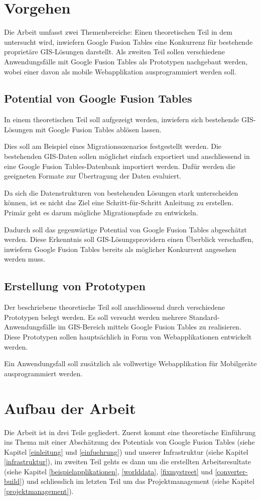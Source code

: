 \section{Vorgehen}
Die Arbeit umfasst zwei Themenbereiche: Einen theoretischen Teil in dem untersucht wird, inwiefern Google Fusion Tables eine Konkurrenz für bestehende proprietäre \gls{GIS}-Lösungen darstellt. Als zweiten Teil sollen verschiedene Anwendungsfälle mit Google Fusion Tables als Prototypen nachgebaut werden, wobei einer davon als mobile Webapplikation ausprogrammiert werden soll.

\subsection{Potential von Google Fusion Tables}
In einem theoretischen Teil soll aufgezeigt werden, inwiefern sich bestehende \gls{GIS}-Lösungen mit Google Fusion Tables ablösen lassen.

Dies soll am Beispiel eines Migrationsszenarios festgestellt werden. Die bestehenden \gls{GIS}-Daten sollen möglichst einfach exportiert und anschliessend in eine Google Fusion Tables-Datenbank importiert werden. Dafür werden die geeigneten Formate zur Übertragung der Daten evaluiert.

Da sich die Datenstrukturen von bestehenden Lösungen stark unterscheiden können, ist es nicht das Ziel eine Schritt-für-Schritt Anleitung zu erstellen. Primär geht es darum mögliche Migrationspfade zu entwickeln.

Dadurch soll das gegenwärtige Potential von Google Fusion Tables abgeschätzt werden. Diese Erkenntnis soll \gls{GIS}-Lösungsprovidern einen Überblick verschaffen, inwiefern Google Fusion Tables bereits als möglicher Konkurrent angesehen werden muss.

\subsection{Erstellung von Prototypen}
Der beschriebene theoretische Teil soll anschliessend durch verschiedene Prototypen belegt werden. Es soll versucht werden mehrere Standard-Anwendungsfälle im GIS-Bereich mittels Google Fusion Tables zu realisieren. Diese Prototypen sollen hauptsächlich in Form von Webapplikationen entwickelt werden.

Ein Anwendungsfall soll zusätzlich als vollwertige Webapplikation für Mobilgeräte ausprogrammiert werden.

\section{Aufbau der Arbeit}
Die Arbeit ist in drei Teile gegliedert. Zuerst kommt eine theoretische Einführung ins Thema mit einer Abschätzung des Potentials von Google Fusion Tables (siehe Kapitel \ref{einleitung} und \ref{einfuehrung}) und unserer Infrastruktur (siehe Kapitel \ref{infrastruktur}), im zweiten Teil gehts es dann um die erstellten Arbeitsresultate (siehe Kapitel \ref{beispielapplikationen}, \ref{worlddata}, \ref{fixmystreet} und \ref{converter-build}) und schliesslich im letzten Teil um das Projektmanagement (siehe Kapitel \ref{projektmanagement}).

